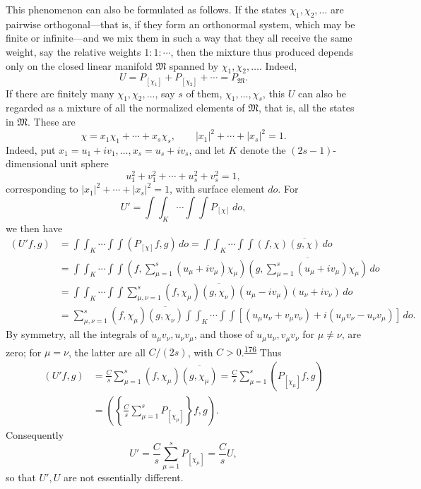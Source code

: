 \documentclass[fontsize=13pt,twoside,openany,headings=normal,parskip=false,bookmarkpackage=false,DIV=calc]{scrbook}
\begin{document}
This phenomenon can also be formulated as follows. If the states $\chi_1,\chi_2,\ldots$ are pairwise orthogonal---that is, if they form an orthonormal system, which may be finite or infinite---and we mix them in such a way that they all receive the same
\hypertarget{origpage-175}{}%
weight, say the relative weights $1:1:\cdots$, then the mixture thus produced depends only on the closed linear manifold $\mathfrak M$ spanned by $\chi_1,\chi_2,\ldots$. Indeed,
\[
U=P_{[\chi_1]}+P_{[\chi_2]}+\cdots=P_{\mathfrak M}.
\]
If there are finitely many $\chi_1,\chi_2,\ldots$, say $s$ of them, $\chi_1,\ldots,\chi_s$, this $U$ can also be regarded as a mixture of all the normalized elements of $\mathfrak M$, that is, all the states in $\mathfrak M$. These are
\[
\chi=x_1\chi_1+\cdots+x_s\chi_s,\qquad |x_1|^2+\cdots+|x_s|^2=1.
\]
Indeed, put $x_1=u_1+iv_1,\ldots,x_s=u_s+iv_s$, and let $K$ denote the $(2s-1)$-dimensional unit sphere
\[
u_1^2+v_1^2+\cdots+u_s^2+v_s^2=1,
\]
corresponding to $|x_1|^2+\cdots+|x_s|^2=1$, with surface element $do$. For
\[
U'=\int\!\!\int_K\cdots\int\!\!\int P_{[\chi]}\,do,
\]
we then have
\begin{align*}
(U'f,g)
&=\int\!\!\int_K\cdots\int\!\!\int(P_{[\chi]}f,g)\,do
=\int\!\!\int_K\cdots\int\!\!\int(f,\chi)\overline{(g,\chi)}\,do\\
&=\int\!\!\int_K\cdots\int\!\!\int
\left(f,\sum_{\mu=1}^s(u_\mu+iv_\mu)\chi_\mu\right)
\overline{\left(g,\sum_{\mu=1}^s(u_\mu+iv_\mu)\chi_\mu\right)}\,do\\
&=\int\!\!\int_K\cdots\int\!\!\int\sum_{\mu,\nu=1}^s
(f,\chi_\mu)\overline{(g,\chi_\nu)}(u_\mu-iv_\mu)(u_\nu+iv_\nu)\,do\\
&=\sum_{\mu,\nu=1}^s(f,\chi_\mu)\overline{(g,\chi_\nu)}
\int\!\!\int_K\cdots\int\!\!\int
[(u_\mu u_\nu+v_\mu v_\nu)+i(u_\mu v_\nu-u_\nu v_\mu)]\,do.
\end{align*}
By symmetry, all the integrals of $u_\mu v_\nu,u_\nu v_\mu$, and those of $u_\mu u_\nu,v_\mu v_\nu$ for $\mu\ne\nu$, are zero; for $\mu=\nu$, the latter are all $C/(2s)$, with $C>0$.\textsuperscript{\hyperlink{note-176}{176}} Thus
\begin{align*}
(U'f,g)&=\frac Cs\sum_{\mu=1}^s(f,\chi_\mu)\overline{(g,\chi_\mu)}
=\frac Cs\sum_{\mu=1}^s(P_{[\chi_\mu]}f,g)\\
&=\left(\left\{\frac Cs\sum_{\mu=1}^sP_{[\chi_\mu]}\right\}f,g\right).
\end{align*}
Consequently
\[
U'=\frac Cs\sum_{\mu=1}^sP_{[\chi_\mu]}=\frac CsU,
\]
so that $U',U$ are not essentially different.
\end{document}
